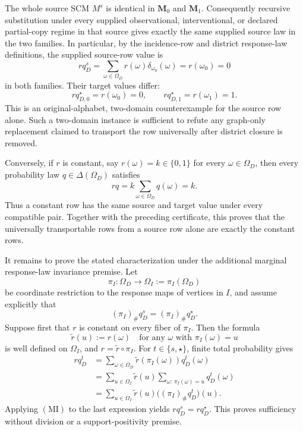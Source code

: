The whole source SCM \(M^s\) is identical in \(\mathbf M_0\) and \(\mathbf M_1\).  Consequently recursive substitution under every supplied observational, interventional, or declared partial-copy regime in that source gives exactly the same supplied source law in the two families.  In particular, by the incidence-row and district response-law definitions, the supplied source-row value is
\[
r q_D^s
=\sum_{\omega\in\Omega_D}r(\omega)\delta_{\omega_0}(\omega)
=r(\omega_0)
=0
\]
in both families.  Their target values differ:
\[
r q_{D,0}^\star=r(\omega_0)=0,
\qquad
r q_{D,1}^\star=r(\omega_1)=1.
\]
This is an original-alphabet, two-domain counterexample for the source row alone.  Such a two-domain instance is sufficient to refute any graph-only replacement claimed to transport the row universally after district closure is removed.

Conversely, if \(r\) is constant, say \(r(\omega)=k\in\{0,1\}\) for every \(\omega\in\Omega_D\), then every probability law \(q\in\Delta(\Omega_D)\) satisfies
\[
r q
=k\sum_{\omega\in\Omega_D}q(\omega)
=k.
\]
Thus a constant row has the same source and target value under every compatible pair.  Together with the preceding certificate, this proves that the universally transportable rows from a source row alone are exactly the constant rows.

It remains to prove the stated characterization under the additional marginal response-law invariance premise.  Let
\[
\pi_I:\Omega_D\longrightarrow\Omega_I:=\pi_I(\Omega_D)
\]
be coordinate restriction to the response maps of vertices in \(I\), and assume explicitly that
\[
(\pi_I)_\#q_D^s=(\pi_I)_\#q_D^\star.
\tag{MI}
\]
Suppose first that \(r\) is constant on every fiber of \(\pi_I\).  Then the formula
\[
\widetilde r(u):=r(\omega)\quad\text{for any }\omega\text{ with }\pi_I(\omega)=u
\]
is well defined on \(\Omega_I\), and \(r=\widetilde r\circ\pi_I\).  For \(t\in\{s,\star\}\), finite total probability gives
\[
\begin{aligned}
r q_D^t
&=\sum_{\omega\in\Omega_D}\widetilde r(\pi_I(\omega))q_D^t(\omega)\\
&=\sum_{u\in\Omega_I}\widetilde r(u)
   \sum_{\omega:\,\pi_I(\omega)=u}q_D^t(\omega)\\
&=\sum_{u\in\Omega_I}\widetilde r(u)
   \bigl((\pi_I)_\#q_D^t\bigr)(u).
\end{aligned}
\]
Applying \((\mathrm{MI})\) to the last expression yields \(r q_D^s=r q_D^\star\).  This proves sufficiency without division or a support-positivity premise.

